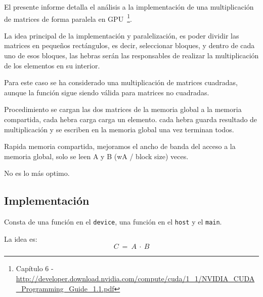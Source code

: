 El presente informe detalla el análisis a la implementación
de una multiplicación de matrices de forma paralela en GPU~\footnote{
Capítulo 6 - \url{http://developer.download.nvidia.com/compute/cuda/1_1/NVIDIA_CUDA_Programming_Guide_1.1.pdf} 
}.

La idea principal de la implementación y paralelización,
es poder dividir las matrices en pequeños rectángulos,
es decir, seleccionar bloques, y dentro de cada uno de esos bloques,
las hebras serán las responsables de realizar la multiplicación
de los elementos en su interior.

Para este caso se ha considerado una multiplicación de matrices
cuadradas, aunque la función sigue siendo válida para matrices
no cuadradas.

Procedimiento
se cargan las dos matrices de la memoria global a la memoria compartida,
cada hebra carga carga un elemento.
cada hebra guarda resultado de multiplicación y se escriben en la memoria global una vez
terminan todos.

Rapida memoria compartida, mejoramos el ancho de banda del acceso a la memoria global,
solo se leen A y B (wA / block size) veces.

No es lo más optimo.

\subsection{Implementación}

Consta de una función en el \texttt{device},
una función en el \texttt{host} y el \texttt{main}.

La idea es:
$$C\ =\ A\ \cdot\ B$$

